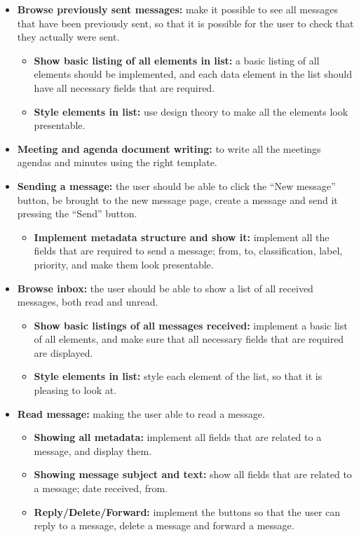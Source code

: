 \begin{itemize}
\item{}\textbf{Browse previously sent messages:} make it possible to see all messages that have been previously sent, so that it is possible for the user to check that they actually were sent.
\begin{itemize}
\item{}\textbf{Show basic listing of all elements in list:} a basic listing of all elements should be implemented, and each data element in the list should have all necessary fields that are required.
\item{}\textbf{Style elements in list:} use design theory to make all the elements look presentable.
\end{itemize}
\item{}\textbf{Meeting and agenda document writing:} to write all the meetings agendas and minutes using the right template.
\item{}\textbf{Sending a message:} the user should be able to click the “New message” button, be brought to the new message page, create a message and send it pressing the “Send” button.
\begin{itemize}
\item{}\textbf{Implement metadata structure and show it:} implement all the fields that are required to send a message; from, to, classification, label, priority, and make them look presentable.
\end{itemize}
\item{}\textbf{Browse inbox:} the user should be able to show a list of all received messages, both read and unread.
\begin{itemize}
\item{}\textbf{Show basic listings of all messages received:} implement a basic list of all elements, and make sure that all necessary fields that are required are displayed.
\item{}\textbf{Style elements in list:} style each element of the list, so that it is pleasing to look at.
\end{itemize}
\item{}\textbf{Read message:} making the user able to read a message.
\begin{itemize}
\item{}\textbf{Showing all metadata:} implement all fields that are related to a message, and display them.
\item{}\textbf{Showing message subject and text:} show all fields that are related to a message; date received, from.
\item{}\textbf{Reply/Delete/Forward:} implement the buttons so that the user can reply to a message, delete a message and forward a message.

\end{itemize}
\end{itemize}
